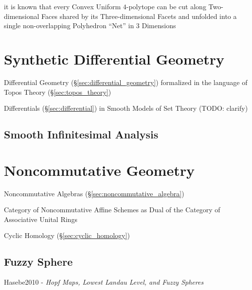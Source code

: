 it is known that every Convex Uniform $4$-polytope can be cut along
Two-dimensional Faces shared by its Three-dimensional Facets and unfolded into
a single non-overlapping Polyhedron ``Net'' in $3$ Dimensions



\section{Synthetic Differential Geometry}
\label{sec:synthetic_differential_geometry}

Differential Geometry (\S\ref{sec:differential_geometry}) formalized in the
language of Topos Theory (\S\ref{sec:topos_theory})

Differentials (\S\ref{sec:differential}) in Smooth Models of Set Theory
(TODO: clarify)



\subsection{Smooth Infinitesimal Analysis}
\label{sec:smooth_infinitesimal_analysis}



\section{Noncommutative Geometry}\label{sec:noncommutative_geometry}

Noncommutative Algebras (\S\ref{sec:noncommutative_algebra})

Category of Noncommutative Affine Schemes as Dual of the Category of
Associative Unital Rings

Cyclic Homology (\S\ref{sec:cyclic_homology})



\subsection{Fuzzy Sphere}\label{sec:fuzzy_sphere}

Hasebe2010 - \emph{Hopf Maps, Lowest Landau Level, and Fuzzy Spheres}
